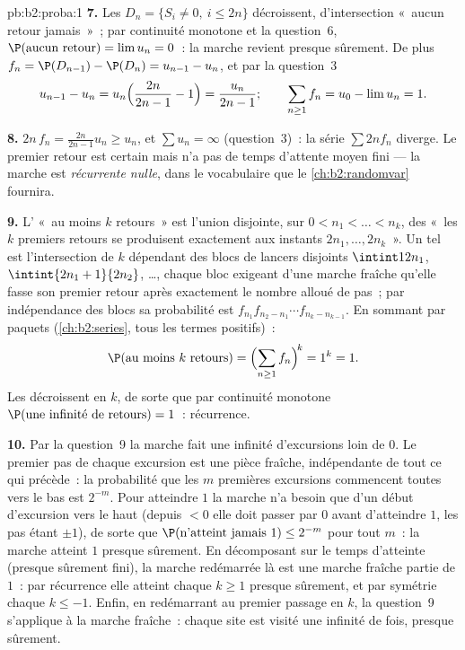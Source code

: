 \begin{solution}{pb:b2:proba:1}
\textbf{7.} Les  $D_n = \{S_i \neq 0,\ i \leq 2n\}$
décroissent, d'intersection «~aucun retour jamais~»~; par continuité
monotone et la question~6, $\P(\text{aucun retour}) = \lim u_n =
0$~: la marche revient presque sûrement. De plus $f_n = \P(D_{n-1})
- \P(D_n) = u_{n-1} - u_n$, et par la question~3
\[
u_{n-1} - u_n = u_n\Bigl(\frac{2n}{2n-1} - 1\Bigr) =
\frac{u_n}{2n-1};
\qquad
\sum_{n\geq1}f_n = u_0 - \lim u_n = 1 .
\]

\textbf{8.} $2n\,f_n = \frac{2n}{2n-1}u_n \geq u_n$, et
$\sum u_n = \infty$ (question~3)~: la série $\sum 2nf_n$
diverge. Le premier retour est certain mais n'a pas de temps
d'attente moyen fini --- la marche est \emph{récurrente nulle}, dans le
vocabulaire que le \cref{ch:b2:randomvar} fournira.

\textbf{9.} L' «~au moins $k$ retours~» est l'union
 disjointe, sur $0 < n_1 < \dots < n_k$, des
 «~les $k$ premiers retours se produisent exactement aux instants
$2n_1, \dots, 2n_k$~». Un tel  est l'intersection de
$k$  dépendant des blocs de lancers disjoints
$\intint1{2n_1}$, $\intint{2n_1+1}{2n_2}$, \dots, chaque bloc
exigeant d'une marche fraîche qu'elle fasse son premier retour après
exactement le nombre alloué de pas~; par indépendance des
blocs sa probabilité est $f_{n_1}f_{n_2-n_1}\cdots
f_{n_k-n_{k-1}}$. En sommant par paquets (\cref{ch:b2:series},
tous les termes positifs)~:
\[
\P(\text{au moins }k\text{ retours})
= \Bigl(\sum_{n\geq1}f_n\Bigr)^{\!k} = 1^k = 1 .
\]
Les  décroissent en $k$, de sorte que par continuité monotone
$\P(\text{une infinité de retours}) = 1$~: récurrence.

\textbf{10.} Par la question~9 la marche fait une infinité
d'excursions loin de $0$. Le premier pas de chaque excursion est
une pièce fraîche, indépendante de tout ce qui précède~: la
probabilité que les $m$ premières excursions commencent toutes vers le bas
est $2^{-m}$. Pour atteindre $1$ la marche n'a besoin que d'un début
d'excursion vers le haut (depuis $<0$ elle doit passer par $0$ avant
d'atteindre $1$, les pas étant $\pm1$), de sorte que $\P(\text{n'atteint jamais }1)
\leq 2^{-m}$ pour tout $m$~: la marche atteint $1$ presque sûrement.
En décomposant sur le temps d'atteinte (presque sûrement fini), la
marche redémarrée là est une marche fraîche partie de $1$~: par
récurrence elle atteint chaque $k \geq 1$ presque sûrement, et par
symétrie chaque $k \leq -1$. Enfin, en redémarrant au premier
passage en $k$, la question~9 s'applique à la marche fraîche~: chaque
site est visité une infinité de fois, presque sûrement.


\end{solution}
